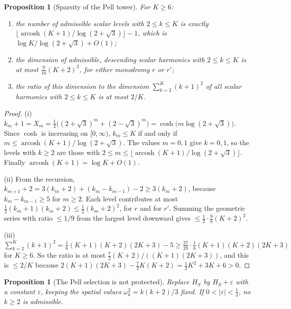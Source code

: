 \documentclass[11pt]{article}
\theoremstyle{canonmath}
\theoremstyle{canonpostulate}
\theoremstyle{canonproposition}
\theoremstyle{canonmath}
\newtheorem{proposition*}[theorem]{Proposition}
\theoremstyle{canonproposition}
\def\mathcal#1{#1}%
\begin{document}
\begin{proposition*}[Sparsity of the Pell tower]\label{prop:sparse}
For $K\ge6$:
\begin{enumerate}[label=(\roman*)]
\item the number of admissible scalar levels with $2\le k\le K$ is exactly $\bigl\lfloor\operatorname{arcosh}(K+1)/\log(2+\sqrt3)\bigr\rfloor - 1$, which is $\log K/\log(2+\sqrt3) + O(1)$;
\item the dimension of admissible, descending scalar harmonics with $2\le k\le K$ is at most $\tfrac9{16}(K+2)^2$, for either monodromy $r$ or $r'$;
\item the ratio of this dimension to the dimension $\sum_{k=2}^K(k+1)^2$ of all scalar harmonics with $2\le k\le K$ is at most $2/K$.
\end{enumerate}
\end{proposition*}

\begin{proof}
(i) $k_m+1 = X_m = \tfrac12\bigl((2+\sqrt3)^m+(2-\sqrt3)^m\bigr) = \cosh\bigl(m\log(2+\sqrt3)\bigr)$. Since $\cosh$ is increasing on $[0,\infty)$, $k_m\le K$ if and only if $m\le\operatorname{arcosh}(K+1)/\log(2+\sqrt3)$. The values $m = 0,1$ give $k = 0,1$, so the levels with $k\ge2$ are those with $2\le m\le\lfloor\operatorname{arcosh}(K+1)/\log(2+\sqrt3)\rfloor$. Finally $\operatorname{arcosh}(K+1) = \log K + O(1)$.

(ii) From the recursion, $k_{m+1}+2 = 3(k_m+2) + (k_m - k_{m-1}) - 2 \ge 3(k_m+2)$, because $k_m - k_{m-1}\ge5$ for $m\ge2$. Each level contributes at most $\tfrac12(k_m+1)(k_m+2)\le\tfrac12(k_m+2)^2$, for $r$ and for $r'$. Summing the geometric series with ratio $\le 1/9$ from the largest level downward gives $\le\tfrac12\cdot\tfrac98(K+2)^2$.

(iii) $\sum_{k=2}^K(k+1)^2 = \tfrac16(K+1)(K+2)(2K+3)-5\ge\tfrac{27}{28}\cdot\tfrac16(K+1)(K+2)(2K+3)$ for $K\ge6$. So the ratio is at most $\tfrac72(K+2)/((K+1)(2K+3))$, and this is $\le2/K$ because $2(K+1)(2K+3) - \tfrac72K(K+2) = \tfrac12K^2+3K+6>0$.
\end{proof}

\begin{proposition*}[The Pell selection is not protected]\label{prop:nonprot}
Replace $\mathcal{H}_S$ by $\mathcal{H}_S+\varepsilon$ with a constant $\varepsilon$, keeping the spatial values $\omega_k^2 = k(k+2)/3$ fixed. If $0<|\varepsilon|<\tfrac13$, no $k\ge2$ is admissible.
\end{proposition*}
\end{document}
